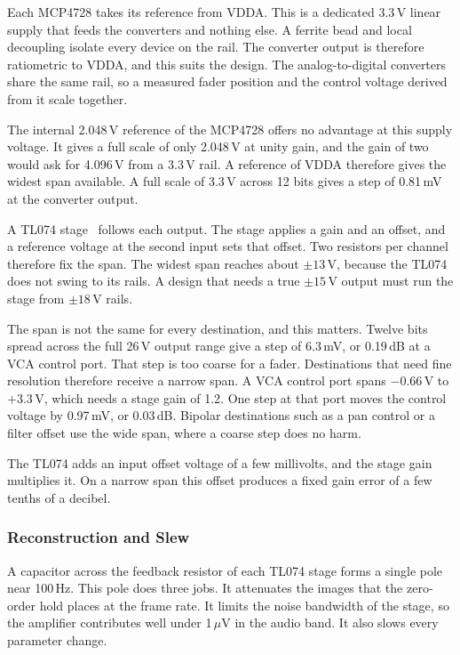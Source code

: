 \documentclass[11pt, letterpaper,titlepage]{article}
\begin{document}
Each MCP4728 takes its reference from VDDA. This is a dedicated 3.3\,V linear
supply that feeds the converters and nothing else. A ferrite bead and local
decoupling isolate every device on the rail. The converter output is therefore
ratiometric to VDDA, and this suits the design. The analog-to-digital converters share the
same rail, so a measured fader position and the control voltage derived from it
scale together.

The internal 2.048\,V reference of the MCP4728 offers no advantage at this
supply voltage. It gives a full scale of only 2.048\,V at unity gain, and the
gain of two would ask for 4.096\,V from a 3.3\,V rail. A reference of VDDA
therefore gives the widest span available. A full scale of 3.3\,V across 12 bits
gives a step of 0.81\,mV at the converter output.

A TL074 stage~\cite{tl074} follows each output. The stage applies a gain and an offset, and
a reference voltage at the second input sets that offset. Two resistors per
channel therefore fix the span. The widest span reaches about $\pm 13$\,V,
because the TL074 does not swing to its rails. A design that needs a true
$\pm 15$\,V output must run the stage from $\pm 18$\,V rails.

The span is not the same for every destination, and this matters. Twelve bits
spread across the full 26\,V output range give a step of 6.3\,mV, or 0.19\,dB at
a VCA control port. That step is too coarse for a fader. Destinations that need
fine resolution therefore receive a narrow span. A VCA control port spans
$-0.66$\,V to $+3.3$\,V, which needs a stage gain of 1.2. One step at that port
moves the control voltage by 0.97\,mV, or 0.03\,dB. Bipolar destinations such as a pan
control or a filter offset use the wide span, where a coarse step does no harm.

The TL074 adds an input offset voltage of a few millivolts, and the stage gain
multiplies it. On a narrow span this offset produces a fixed gain error of a
few tenths of a decibel. 
\subsubsection*{Reconstruction and Slew}
\label{sssec:cv-filter}

A capacitor across the feedback resistor of each TL074 stage forms a single
pole near 100\,Hz. This pole does three jobs. It attenuates the images that the
zero-order hold places at the frame rate. It limits the noise bandwidth of the
stage, so the amplifier contributes well under 1\,$\mu$V in the audio band. It
also slows every parameter change.
\end{document}

